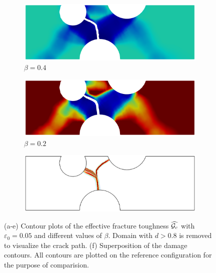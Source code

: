 \begin{figure}[!htb]
  \begin{subfigure}[b]{0.3\textwidth}
    \centering
    \includegraphics[width=\textwidth,scale=0.5]{Chapter5/figures/3pb/beta_0.4}
    \caption{$\beta=0.4$}
  \end{subfigure}
  \begin{subfigure}[b]{0.3\textwidth}
    \centering
    \includegraphics[width=\textwidth,scale=0.5]{Chapter5/figures/3pb/beta_0.2}
    \caption{$\beta=0.2$}
  \end{subfigure}
  \begin{subfigure}[b]{0.3\textwidth}
    \centering
    \includegraphics[width=\textwidth,scale=0.5]{Chapter5/figures/3pb/compare_e0_constant}
    \caption{}
  \end{subfigure}
  \caption{(a-e) Contour plots of the effective fracture toughness $\widehat{{\mathcal{G}_c}}$ with $\varepsilon_0=0.05$ and different values of $\beta$. Domain with $d > 0.8$ is removed to visualize the crack path. (f) Superposition of the damage contours. All contours are plotted on the reference configuration for the purpose of comparision.}
  \label{fig: Chapter5/3pb/2D_comparison_constant_e0}
\end{figure}
